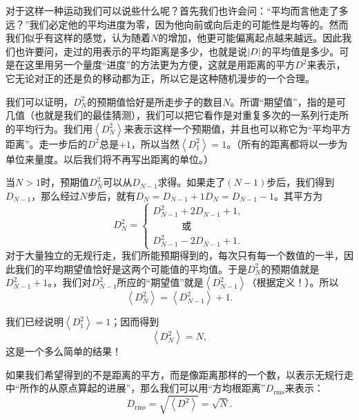 对于这样一种运动我们可以说些什么呢？首先我们也许会问：“平均而言他走了多远？”我们必定他的平均进度为零，因为他向前或向后走的可能性是均等的。然而我们似乎有这样的感觉，认为随着$N$的增加，他更可能偏离起点越来越远。因此我们也许要问，走过的用表示的平均距离是多少，也就是说$\lvert D\rvert$的平均值是多少。可是在这里用另一个量度“进度”的方法更为方便，这就是用距离的平方$D^2$来表示，它无论对正的还是负的移动都为正，所以它是这种随机漫步的一个合理。

我们可以证明，$D_N^2$的预期值恰好是所走步子的数目$N$。所谓“期望值”，指的是可几值（也就是我们的最佳猜测），我们可以把它看作是对重复多次的一系列行走所的平均行为。我们用$\left <D_N^2 \right >$来表示这样一个预期值，并且也可以称它为“平均平方距离”。走一步后的$D^2$总是$+1$，所以当然$\left < D_1^2 \right >=1$。（所有的距离都将以一步为单位来量度。以后我们将不再写出距离的单位。）

当$N>1$时，预期值$D_N^2$可以从$D_{N-1}$求得。如果走了$(N-1)$步后，我们得到$D_{N-1}$，那么经过$N$步后，就有$D_N=D_{N-1}+1$$D_N=D_{N-1}-1$。其平方为
\begin{equation}
\label{Eq:I:6:7}
D_N^2=
\begin{cases}
D_{N-1}^2+2D_{N-1}+1,\\[2ex]
\quad\qquad\textit{或}\\[2ex]
D_{N-1}^2-2D_{N-1}+1.
\end{cases}
\end{equation}
对于大量独立的无规行走，我们所能预期得到的，每次只有每一个数值的一半，因此我们的平均期望值恰好是这两个可能值的平均值。于是$D_N^2$的预期值就是$D_{N-1}^2+1$。，我们对$D_{N-1}^2$所应的“期望值”就是$\left <D_{N-1}^2 \right >$（根据定义！）。所以
\begin{equation}
\label{Eq:I:6:8}
\left < D_N^2 \right >=\left < D_{N-1}^2 \right >+1.
\end{equation}

我们已经说明$\left < D_1^2 \right > = 1$；因而得到
\begin{equation}
\label{Eq:I:6:9}
\left < D_N^2 \right > =N,
\end{equation} 
这是一个多么简单的结果！

如果我们希望得到的不是距离的平方，而是像距离那样的一个数，以表示无规行走中“所作的从原点算起的进展”，那么我们可以用“方均根距离”$D_{\text{rms}}$来表示：
\begin{equation}
\label{Eq:I:6:10}
D_{\text{rms}}=\sqrt{\left < D^2 \right > }=\sqrt{N}.
\end{equation}

